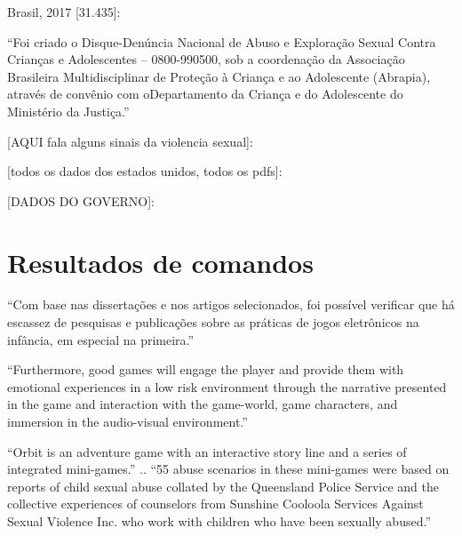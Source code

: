Brasil, 2017 [31.435]: %

``Foi criado o Disque-Denúncia Nacional de Abuso e Exploração Sexual Contra
Crianças e Adolescentes – 0800-990500, sob a coordenação da Associação Brasileira
Multidisciplinar de Proteção à Criança e ao Adolescente (Abrapia), através de convênio com oDepartamento da Criança e do Adolescente do Ministério da Justiça.''


[AQUI fala alguns sinais da violencia sexual]: %




[todos os dados dos estados unidos, todos os pdfs]: %

[DADOS DO GOVERNO]: %


\chapter{Resultados de comandos}\label{cap_exemplos}

``Com base nas dissertações e nos artigos selecionados, foi possível verificar que há escassez de pesquisas e publicações sobre as práticas de jogos eletrônicos na infância, em especial na primeira.''  \cite{cotonhoto2016pratica}

``Furthermore, good games will engage the player and provide them with emotional experiences in a low risk environment through the narrative presented in the game and interaction with the game-world, game characters, and immersion in the audio-visual environment.'' \cite{dip2016advancing}

``Orbit is an adventure game with an interactive story line and a series of integrated mini-games.''\cite{dip2016advancing} .. ``55 abuse scenarios in these mini-games were based on reports of child sexual abuse collated by the Queensland Police Service and the collective experiences of counselors from Sunshine Cooloola Services Against Sexual Violence Inc. who work with children who have been sexually abused.''

